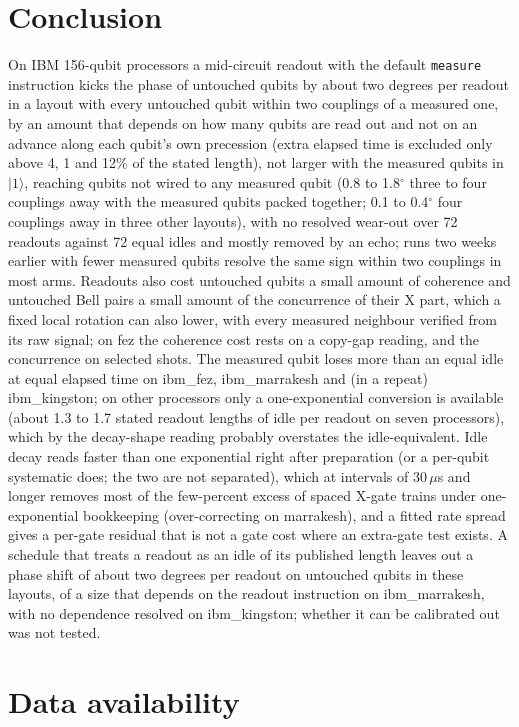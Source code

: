 \documentclass[reprint,amsmath,amssymb,aps,superscriptaddress,nofootinbib]{revtex4-2}
\newcommand{\us}{\,$\mu$s}
\begin{document}
\section{Conclusion}

On IBM 156-qubit processors a mid-circuit readout with the default \texttt{measure} instruction kicks the phase of untouched qubits by about two degrees per readout in a layout with every untouched qubit within two couplings of a measured one, by an amount that depends on how many qubits are read out and not on an advance along each qubit's own precession (extra elapsed time is excluded only above 4, 1 and 12\% of the stated length), not larger with the measured qubits in $|1\rangle$, reaching qubits not wired to any measured qubit (0.8 to 1.8$^\circ$ three to four couplings away with the measured qubits packed together; 0.1 to 0.4$^\circ$ four couplings away in three other layouts), with no resolved wear-out over 72 readouts against 72 equal idles and mostly removed by an echo; runs two weeks earlier with fewer measured qubits resolve the same sign within two couplings in most arms. Readouts also cost untouched qubits a small amount of coherence and untouched Bell pairs a small amount of the concurrence of their X part, which a fixed local rotation can also lower, with every measured neighbour verified from its raw signal; on fez the coherence cost rests on a copy-gap reading, and the concurrence on selected shots. The measured qubit loses more than an equal idle at equal elapsed time on ibm\_fez, ibm\_marrakesh and (in a repeat) ibm\_kingston; on other processors only a one-exponential conversion is available (about 1.3 to 1.7 stated readout lengths of idle per readout on seven processors), which by the decay-shape reading probably overstates the idle-equivalent. Idle decay reads faster than one exponential right after preparation (or a per-qubit systematic does; the two are not separated), which at intervals of 30\us{} and longer removes most of the few-percent excess of spaced X-gate trains under one-exponential bookkeeping (over-correcting on marrakesh), and a fitted rate spread gives a per-gate residual that is not a gate cost where an extra-gate test exists. A schedule that treats a readout as an idle of its published length leaves out a phase shift of about two degrees per readout on untouched qubits in these layouts, of a size that depends on the readout instruction on ibm\_marrakesh, with no dependence resolved on ibm\_kingston; whether it can be calibrated out was not tested.

\section{Data availability}
\end{document}
